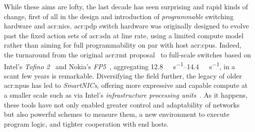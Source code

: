 
While these aims are lofty, the last decade has seen surprising and rapid kinds of change, first of all in the design and introduction of \emph{programmable} switching hardware and \glspl{acr:nic}.
\gls{acr:pdp} switch hardware was originally designed to evolve past the fixed action sets of \gls{acr:sdn} at line rate, using a limited compute model rather than aiming for full programmability on par with host \glspl{acr:cpu}.
Indeed, the turnaround from the original \gls{acr:rmt} proposal~\parencite{DBLP:conf/sigcomm/BosshartGKVMIMH13} to full-scale switches based on Intel's \emph{Tofino 2}~\parencite{tofino2} and Nokia's \emph{FP5}~\parencite{nokia-fp5}, aggregating \qtyrange{12.8}{14.4}{\tera\bit\per\second}, in a scant few years is remarkable.
Diversifying the field further, the legacy of older \glspl{acr:npu} has led to \emph{SmartNICs}, offering more expressive and capable compute at a smaller scale such as via Intel's \emph{infrastructure processing units}~\parencite{intel-ipu}.
As it happens, these tools have not only enabled greater control and adaptability of networks but also powerful schemes to measure them, a new environment to execute program logic, and tighter cooperation with end hosts.
